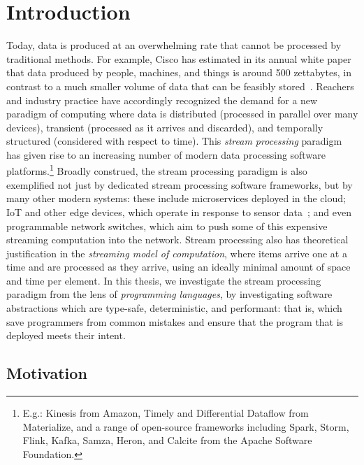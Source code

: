 \chapter{Introduction}
\label{cha:intro}

Today, data is produced at an overwhelming rate
that cannot be processed by traditional methods.
For example, Cisco has estimated in its annual white paper
that data produced by people, machines, and things
is around 500 zettabytes, in contrast to a much smaller volume
of data that can be feasibly stored~\cite{index2018forecast}.
Reachers and industry practice have accordingly recognized the demand
for a new paradigm of computing where data is
distributed (processed in parallel over many devices),
transient (processed as it arrives and discarded),
and temporally structured (considered with respect to time).
This \emph{stream processing} paradigm has given rise to an increasing number
of modern data processing software platforms.\footnote{E.g.: Kinesis from Amazon, Timely and Differential Dataflow from Materialize, and a range of open-source frameworks including Spark, Storm, Flink, Kafka, Samza, Heron, and Calcite from the Apache Software Foundation.}
Broadly construed, the stream processing paradigm is also exemplified not just by dedicated stream processing software frameworks, but by many other modern systems: these include microservices deployed in the cloud; IoT and other edge devices, which operate in response
to sensor data~\cite{shi2016edge, ashton2009internet}; and even programmable network switches,
which aim to push some of this expensive streaming computation
into the network.
Stream processing also has theoretical justification in the \emph{streaming model of computation},
where items arrive one at a time and are processed as they arrive, using
an ideally minimal amount of space and time per element.
In this thesis, we investigate the stream processing paradigm from the lens of \emph{programming languages}, by investigating software abstractions which are type-safe, deterministic, and performant: that is, which save programmers from common mistakes and ensure that the program that is deployed meets their intent.

\section{Motivation}


